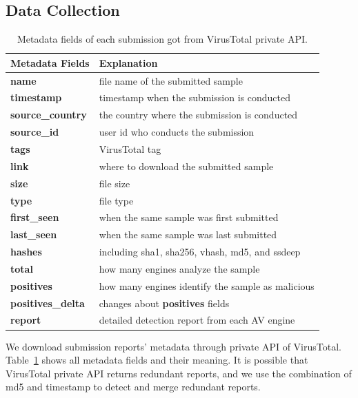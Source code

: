 \subsection{Data Collection}
\begin{table}[h!]
\centering
\footnotesize
{
\begin{tabular}{l|l}
\hline
Metadata Fields & Explanation \\
\hline                            
{\bf name}      & file name of the submitted sample \\
{\bf timestamp} & timestamp when the submission is conducted \\
{\bf source\_country} & the country where the submission is conducted \\
{\bf source\_id} & user id who conducts the submission\\
{\bf tags} & VirusTotal tag \\
{\bf link} & where to download the submitted sample \\
{\bf size} & file size \\
{\bf type} & file type \\
{\bf first\_seen} & when the same sample was first submitted \\
{\bf last\_seen} & when the same sample was last submitted \\
{\bf hashes} & including sha1, sha256, vhash, md5, and ssdeep\\
{\bf total} & how many engines analyze the sample\\
{\bf positives} & how many engines identify the sample as malicious \\
{\bf positives\_delta} & changes about {\bf positives} fields \\
{\bf report} & detailed detection report from each AV engine \\
\hline

\end{tabular}
}
\caption{Metadata fields of each submission got from VirusTotal private API.}
\label{tab:fields}
\end{table}


We download submission reports' metadata through private API of VirusTotal. 
Table~\ref{tab:fields} shows all metadata fields and their meaning. 
It is possible that VirusTotal private API returns redundant reports, 
and we use the combination of md5 and timestamp
 to detect and merge redundant reports.

